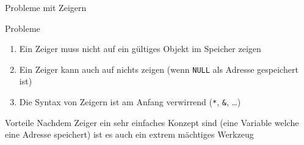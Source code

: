 \documentclass[presentation]{beamer}
\begin{document}
\begin{frame}[label={sec:org022b8c8},fragile]{Probleme mit Zeigern}
 \begin{block}{Probleme}
\begin{enumerate}
\item Ein Zeiger muss nicht auf ein gültiges Objekt im Speicher zeigen
\item Ein Zeiger kann auch auf nichts zeigen (wenn {\color{solarizedYellow}\verb!NULL!} als Adresse
gespeichert ist)
\item Die Syntax von Zeigern ist am Anfang verwirrend ({\color{solarizedYellow}\verb!*!}, {\color{solarizedYellow}\verb!&!}, \ldots{})
\end{enumerate}
\end{block}
\begin{block}{Vorteile}
Nachdem Zeiger ein sehr einfaches Konzept sind (eine Variable welche
eine Adresse speichert) ist es auch ein extrem mächtiges Werkzeug
\end{block}
\end{frame}
\end{document}
